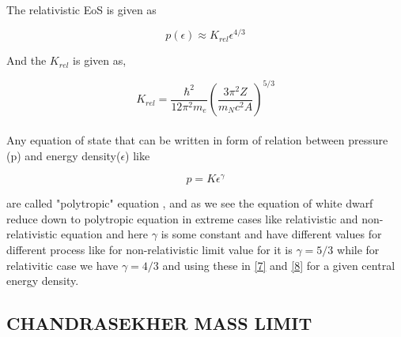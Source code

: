 \documentclass{report}
\begin{document}
\paragraph{ }
The relativistic EoS is given as  
\begin{center}
\begin{equation}
p(\epsilon) \approx  K_{rel}\epsilon ^{4/3}
\label{26}
\end{equation}
\end{center}
And the $K_{rel}$ is given as,
\begin{center}
\begin{equation}
K_{rel} = \frac{\hbar ^2}{12\pi ^2 m_e}\left(\frac{3\pi^2 Z}{m_N c^2 A} \right)^{5/3} 
\label{27}
\end{equation}
\end{center}
\paragraph{ }
Any equation of state that can be written in form of relation between pressure (p) and energy density($\epsilon$) like 
\begin{center}
\begin{equation}
p = K\epsilon^{\gamma}
\label{28}
\end{equation}
\end{center}
are called "polytropic" equation , and as we see the equation of white dwarf reduce down to polytropic equation in extreme cases like relativistic and non-relativistic equation and here $\gamma$ is some constant and have different values for different process like for non-relativistic limit value for it is  $\gamma = 5/3$ while for relativitic case we have $\gamma= 4/3 $ and using these in \ref{7} and \ref{8} for a given central energy density.
\subsection{CHANDRASEKHER MASS LIMIT}
\end{document}
